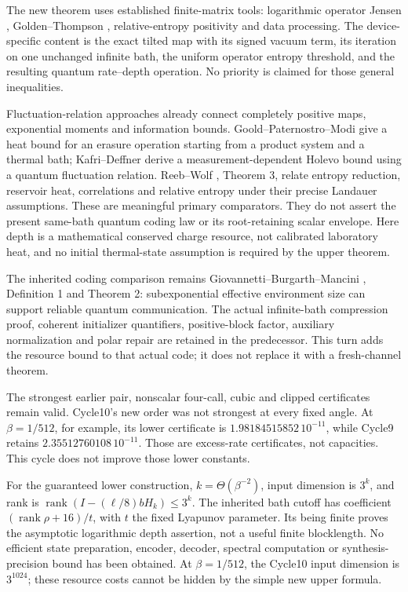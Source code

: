 \documentclass[11pt]{article}
\newcommand{\rank}{\operatorname{rank}}
\begin{document}
The new theorem uses established finite-matrix tools: logarithmic
operator Jensen \cite{HP}, Golden--Thompson \cite{Golden,Thompson},
relative-entropy positivity and data processing.
The device-specific content is the exact tilted map with its signed
vacuum term, its iteration on one unchanged infinite bath, the uniform
operator entropy threshold, and the resulting quantum rate--depth
operation. No priority is claimed for those general inequalities.

Fluctuation-relation approaches already connect completely positive maps,
exponential moments and information bounds. Goold--Paternostro--Modi
\cite{GPM} give a heat bound for an erasure operation starting from a
product system and a thermal bath; Kafri--Deffner \cite{KD} derive a
measurement-dependent Holevo bound using a quantum fluctuation relation.
Reeb--Wolf \cite{RW}, Theorem 3, relate entropy reduction, reservoir heat,
correlations and relative entropy under their precise Landauer assumptions.
These are meaningful primary comparators. They do not assert the present
same-bath quantum coding law or its root-retaining scalar envelope.
Here depth is a mathematical conserved charge resource, not calibrated
laboratory heat, and no initial thermal-state assumption is required by
the upper theorem.

The inherited coding comparison remains
Giovannetti--Burgarth--Mancini \cite{GBM}, Definition 1 and Theorem 2:
subexponential effective environment size can support reliable quantum
communication. The actual infinite-bath compression proof, coherent
initializer quantifiers, positive-block factor, auxiliary normalization
and polar repair are retained in the predecessor. This turn adds the
resource bound to that actual code; it does not replace it with a
fresh-channel theorem.

The strongest earlier pair, nonscalar four-call, cubic and clipped
certificates remain valid. Cycle10's new order was not strongest at
every fixed angle. At \(\beta=1/512\), for example, its lower certificate
is \(1.98184515852\,10^{-11}\), while Cycle9 retains
\(2.35512760108\,10^{-11}\). Those are excess-rate certificates, not
capacities. This cycle does not improve those lower constants.

For the guaranteed lower construction, \(k=\Theta(\beta^{-2})\),
input dimension is \(3^k\), and rank is
\(\rank(I-(\ell/8)bH_k)\le3^k\). The inherited bath cutoff has coefficient
\((\rank\rho+16)/t\), with \(t\) the fixed Lyapunov parameter.
Its being finite proves the asymptotic logarithmic depth assertion,
not a useful finite blocklength. No efficient state preparation,
encoder, decoder, spectral computation or synthesis-precision bound
has been obtained. At \(\beta=1/512\), the Cycle10 input dimension is
\(3^{1024}\); these resource costs cannot be hidden by the simple new
upper formula.
\end{document}
